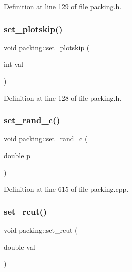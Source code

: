 Definition at line 129 of file packing.\+h.

\mbox{\label{classpacking_a9c34cb0d24ff7bf013c19f801591c646}} 
\subsubsection{\texorpdfstring{set\+\_\+plotskip()}{set\_plotskip()}}
{\footnotesize\ttfamily void packing\+::set\+\_\+plotskip (\begin{DoxyParamCaption}\item[{int}]{val }\end{DoxyParamCaption})\hspace{0.3cm}{\ttfamily [inline]}}



Definition at line 128 of file packing.\+h.

\mbox{\label{classpacking_ab1b640756b858f5df25d88ab841300b2}} 
\subsubsection{\texorpdfstring{set\+\_\+rand\+\_\+c()}{set\_rand\_c()}}
{\footnotesize\ttfamily void packing\+::set\+\_\+rand\+\_\+c (\begin{DoxyParamCaption}\item[{double}]{p }\end{DoxyParamCaption})}



Definition at line 615 of file packing.\+cpp.

\mbox{\label{classpacking_a073820579ccf298710943fefe023d853}} 
\subsubsection{\texorpdfstring{set\+\_\+rcut()}{set\_rcut()}}
{\footnotesize\ttfamily void packing\+::set\+\_\+rcut (\begin{DoxyParamCaption}\item[{double}]{val }\end{DoxyParamCaption})\hspace{0.3cm}{\ttfamily [inline]}}



